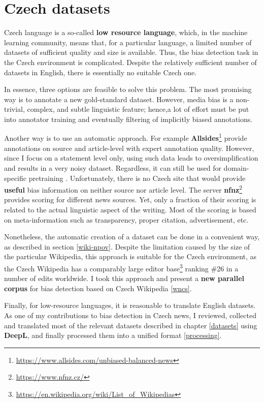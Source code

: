 \chapter{Czech datasets}
Czech language is a so-called \textbf{low resource language}, which, in the machine learning community, means that, for a particular language, a limited number of datasets of sufficient quality and size is available. Thus, the bias detection task in the Czech environment is complicated. Despite the relatively sufficient number of datasets in English, there is essentially no suitable Czech one.

 In essence, three options are feasible to solve this problem. The most promising way is to annotate a new gold-standard dataset. However, media bias is a non-trivial, complex, and subtle linguistic feature; hence,a lot of effort must be put into annotator training and eventually filtering of implicitly biased annotations.
 
 Another way is to use an automatic approach. For example \textbf{Allsides}\footnote{\url{https://www.allsides.com/unbiased-balanced-news}} provide annotations on source and article-level with expert annotation quality. However, since I focus on a statement level only, using such data leads to oversimplification and results in a very noisy dataset. Regardless, it can still be used for domain-specific pretraining \cite{Spinde2021f}. Unfortunately, there is no Czech site that would provide \textbf{useful} bias information on neither source nor article level. The server \textbf{\Gls{nfnz}}\footnote{\url{https://www.nfnz.cz/}} provides scoring for different news sources. Yet, only a fraction of their scoring is related to the actual linguistic aspect of the writing. Most of the scoring is based on meta-information such as transparency, proper citation, advertisement, etc.
 
 Nonetheless, the automatic creation of a dataset can be done in a convenient way, as described in section \ref{wiki-npov}. Despite the limitation caused by the size of the particular Wikipedia, this approach is suitable for the Czech environment, as the Czech Wikipedia has a comparably large editor base\footnote{ \url{https://en.wikipedia.org/wiki/List_of_Wikipedias}} ranking \#26 in a number of edits worldwide. I took this approach and present a \textbf{new parallel corpus} for bias detection based on Czech Wikipedia \ref{wncs}.
 
 Finally, for low-resource languages, it is reasonable to translate English datasets. As one of my contributions to bias detection in Czech news, I reviewed, collected and translated most of the relevant datasets described in chapter \ref{datasets} using \textbf{DeepL}, and finally processed them into a unified format \ref{processing}.
 
